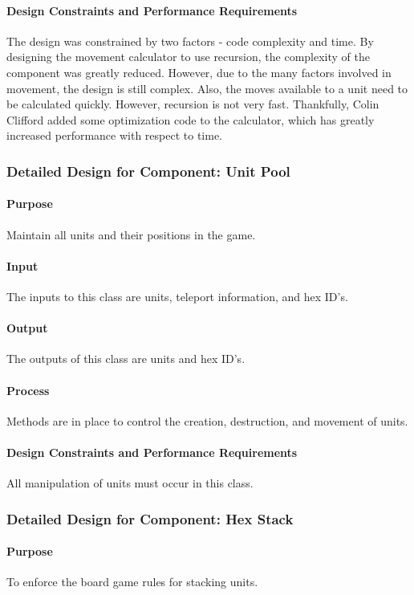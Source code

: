 \documentclass[12pt,a4paper,titlepage]{article}
\begin{document}
\paragraph{Design Constraints and Performance Requirements} The design was constrained by two factors - code complexity and time. By designing the movement calculator to use recursion, the complexity of the component was greatly reduced. However, due to the many factors involved in movement, the design is still complex. Also, the moves available to a unit need to be calculated quickly. However, recursion is not very fast. Thankfully, Colin Clifford added some optimization code to the calculator, which has greatly increased performance with respect to time.

\subsubsection{Detailed Design for Component: Unit Pool}
\paragraph{Purpose} Maintain all units and their positions in the game.
\paragraph{Input} The inputs to this class are units, teleport information, and hex ID's.
\paragraph{Output} The outputs of this class are units and hex ID's. 
\paragraph{Process} Methods are in place to control the creation, destruction, and movement of units.
\paragraph{Design Constraints and Performance Requirements} All manipulation of units must occur in this class.

\subsubsection{Detailed Design for Component: Hex Stack}
\paragraph{Purpose} To enforce the board game rules for stacking units.
\end{document}
